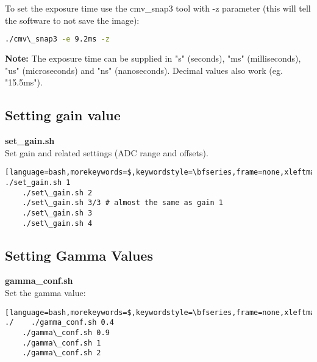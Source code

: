 To set the exposure time use the cmv\_snap3 tool with -z parameter (this will tell the software to not save the image): 

\begin{lstlisting}[language=bash,morekeywords=$,keywordstyle=\bfseries,frame=none,xleftmargin=.25in,belowskip=2em, aboveskip=2em]
./cmv\_snap3 -e 9.2ms -z
\end{lstlisting}

\textbf{Note:} The exposure time can be supplied in "s" (seconds), "ms" (milliseconds), "us" (microseconds) and "ns" (nanoseconds). Decimal values also work (eg. "15.5ms"). 



\subsection{Setting gain value}

\textbf{set\_gain.sh}\\

Set gain and related settings (ADC range and offsets). 

\begin{lstlisting}[language=bash,morekeywords=$,keywordstyle=\bfseries,frame=none,xleftmargin=.25in,belowskip=2em,     ./set_gain.sh 1 
    ./set\_gain.sh 2
    ./set\_gain.sh 3/3 # almost the same as gain 1
    ./set\_gain.sh 3
    ./set\_gain.sh 4
\end{lstlisting}



\subsection{Setting Gamma Values}

\textbf{gamma\_conf.sh}\\

Set the gamma value: 

\begin{lstlisting}[language=bash,morekeywords=$,keywordstyle=\bfseries,frame=none,xleftmargin=.25in,belowskip=2em,     ./    ./gamma_conf.sh 0.4
    ./gamma\_conf.sh 0.9
    ./gamma\_conf.sh 1
    ./gamma\_conf.sh 2
\end{lstlisting}


